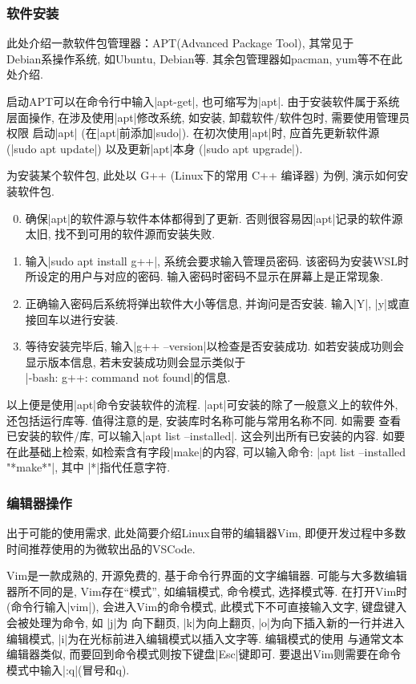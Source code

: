 \subsubsection{软件安装}
此处介绍一款软件包管理器：APT(Advanced Package Tool), 其常见于\\Debian系操作系统, 如Ubuntu, Debian等. 其余包管理器如pacman, yum等不在此处介绍.

启动APT可以在命令行中输入\cverb|apt-get|, 也可缩写为\cverb|apt|. 由于安装软件属于系统层面操作, 在涉及使用\cverb|apt|修改系统, 如安装, 卸载软件/软件包时, 需要使用管理员权限
启动\cverb|apt| (在\cverb|apt|前添加\cverb|sudo|). 在初次使用\cverb|apt|时, 应首先更新软件源 (\cverb|sudo apt update|)
以及更新\cverb|apt|本身 (\cverb|sudo apt upgrade|).

为安装某个软件包, 此处以 G++ (Linux下的常用 C++ 编译器) 为例, 演示如何安装软件包.
\begin{enumerate}
      \setcounter{enumi}{-1}
      \item 确保\cverb|apt|的软件源与软件本体都得到了更新. 否则很容易因\cverb|apt|记录的软件源太旧, 找不到可用的软件源而安装失败.
      \item 输入\cverb|sudo apt install g++|, 系统会要求输入管理员密码. 该密码为安装WSL时所设定的用户与对应的密码. 输入密码时密码不显示在屏幕上是正常现象.
      \item 正确输入密码后系统将弹出软件大小等信息, 并询问是否安装. 输入\cverb|Y|, \cverb|y|或直接回车以进行安装.
      \item 等待安装完毕后, 输入\cverb|g++ --version|以检查是否安装成功. 如若安装成功则会显示版本信息, 若未安装成功则会显示类似于\\
            \cverb|-bash: g++: command not found|的信息.
\end{enumerate}
以上便是使用\cverb|apt|命令安装软件的流程. \cverb|apt|可安装的除了一般意义上的软件外, 还包括运行库等. 值得注意的是, 安装库时名称可能与常用名称不同. 如需要
查看已安装的软件/库, 可以输入\cverb|apt list --installed|. 这会列出所有已安装的内容. 如要在此基础上检索, 如检索含有字段\cverb|make|的内容, 可以输入命令:
\cverb|apt list --installed "*make*"|, 其中 \cverb|*|指代任意字符.

\subsubsection{编辑器操作}

出于可能的使用需求, 此处简要介绍Linux自带的编辑器Vim, 即便开发过程中多数时间推荐使用的为微软出品的VSCode.

Vim是一款成熟的, 开源免费的, 基于命令行界面的文字编辑器. 可能与大多数编辑器所不同的是, Vim存在``模式'', 如编辑模式, 命令模式, 选择模式等.
在打开Vim时(命令行输入\cverb|vim|), 会进入Vim的命令模式, 此模式下不可直接输入文字, 键盘键入会被处理为命令, 如 \cverb|j|为
向下翻页, \cverb|k|为向上翻页, \cverb|o|为向下插入新的一行并进入编辑模式, \cverb|i|为在光标前进入编辑模式以插入文字等. 编辑模式的使用
与通常文本编辑器类似, 而要回到命令模式则按下键盘\cverb|Esc|键即可. 要退出Vim则需要在命令模式中输入\cverb|:q|(冒号和q).

